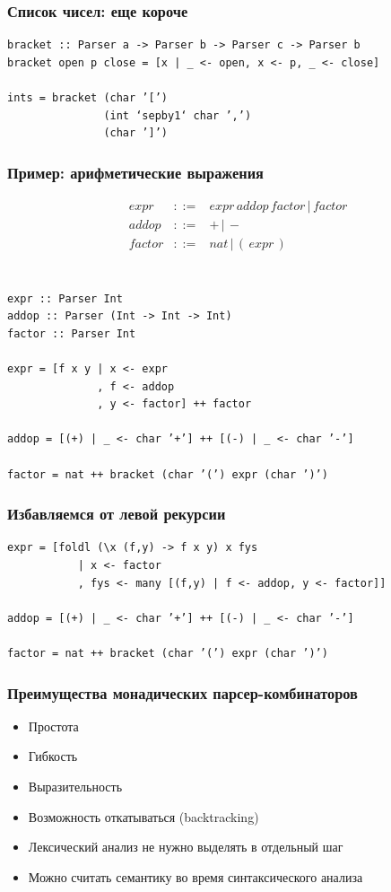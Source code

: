 \documentclass{beamer}
\begin{document}
\begin{frame}[fragile]
  \transwipe[direction=90]
  \frametitle{Список чисел: еще короче}
\begin{verbatim}
bracket :: Parser a -> Parser b -> Parser c -> Parser b
bracket open p close = [x | _ <- open, x <- p, _ <- close]

ints = bracket (char ’[’)
               (int ‘sepby1‘ char ’,’)
               (char ’]’)
\end{verbatim}
\end{frame}


\begin{frame}[fragile]
  \transwipe[direction=90]
  \frametitle{Пример: арифметические выражения}
$$
\begin{array}{crcl}
&expr & ::= & expr \, addop \, factor \, | \, factor \\ 
&addop & ::= & + \, | \, - \\ 
&factor & ::= & nat \, | \, ( \, expr \, ) \\
\end{array}
$$ 

\begin{verbatim}

expr :: Parser Int
addop :: Parser (Int -> Int -> Int)
factor :: Parser Int

expr = [f x y | x <- expr
              , f <- addop
              , y <- factor] ++ factor

addop = [(+) | _ <- char ’+’] ++ [(-) | _ <- char ’-’]

factor = nat ++ bracket (char ’(’) expr (char ’)’)
\end{verbatim}
\end{frame}

\begin{frame}[fragile]
  \transwipe[direction=90]
  \frametitle{Избавляемся от левой рекурсии}

\begin{verbatim}
expr = [foldl (\x (f,y) -> f x y) x fys
           | x <- factor
           , fys <- many [(f,y) | f <- addop, y <- factor]]

addop = [(+) | _ <- char ’+’] ++ [(-) | _ <- char ’-’]

factor = nat ++ bracket (char ’(’) expr (char ’)’)
\end{verbatim}
\end{frame}

\begin{frame}[fragile]
  \transwipe[direction=90]
  \frametitle{Преимущества монадических парсер-комбинаторов}
  \begin{itemize}
    \item Простота
    \item Гибкость
    \item Выразительность
    \item Возможность откатываться (backtracking)
    \item Лексический анализ не нужно выделять в отдельный шаг
    \item Можно считать семантику во время синтаксического анализа
  \end{itemize}
\end{frame}
\end{document}
